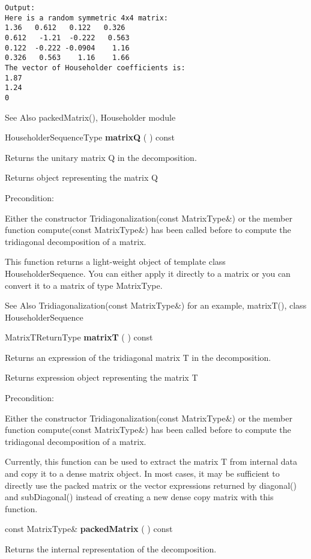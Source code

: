 \begin{verbatim}
Output:
Here is a random symmetric 4x4 matrix:
1.36   0.612   0.122   0.326
0.612   -1.21  -0.222   0.563
0.122  -0.222 -0.0904    1.16
0.326   0.563    1.16    1.66
The vector of Householder coefficients is:
1.87
1.24
0
\end{verbatim}

See Also
packedMatrix(), Householder module 


\vspace{0.3cm}
HouseholderSequenceType \textbf{matrixQ}  ( )  const 

Returns the unitary matrix Q in the decomposition. 

Returns object representing the matrix Q

Precondition:

Either the constructor Tridiagonalization(const MatrixType\&) or the member function compute(const MatrixType\&) has been called before to compute the tridiagonal decomposition of a matrix.

This function returns a light-weight object of template class HouseholderSequence. You can either apply it directly to a matrix or you can convert it to a matrix of type MatrixType.

See Also
Tridiagonalization(const MatrixType\&) for an example, matrixT(), class HouseholderSequence 


\vspace{0.3cm}
MatrixTReturnType \textbf{matrixT}  ( )  const 

Returns an expression of the tridiagonal matrix T in the decomposition. 

Returns expression object representing the matrix T

Precondition:

Either the constructor Tridiagonalization(const MatrixType\&) or the member function compute(const MatrixType\&) has been called before to compute the tridiagonal decomposition of a matrix.

Currently, this function can be used to extract the matrix T from internal data and copy it to a dense matrix object. In most cases, it may be sufficient to directly use the packed matrix or the vector expressions returned by diagonal() and subDiagonal() instead of creating a new dense copy matrix with this function.


\vspace{0.3cm}
const MatrixType\& \textbf{packedMatrix}  ( )  const 

Returns the internal representation of the decomposition. 

